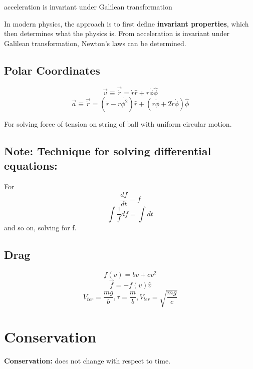 acceleration is invariant under Galilean transformation

\hfill
\hfill

In modern physics, the approach is to first define \textbf{invariant properties}, which then determines what the physics is. From acceleration is invariant under Galilean transformation, Newton's laws can be determined.



\subsection{Polar Coordinates}

\begin{equation}
	\label{}
	\vec{v}\equiv \vec{\dot{r}}=\dot{r}\hat{r}+r\dot{\phi}\hat{\phi}	
\end{equation}
\begin{equation}
	\label{}	
	\vec{a}\equiv \vec{\ddot{r}}=(\ddot{r}-r\dot{\phi^{2}})\hat{r}+(r\ddot{\phi}+2\dot{r}\dot{\phi})\hat{\phi}
\end{equation}

For solving force of tension on string of ball with uniform circular motion. 


\subsection{Note: Technique for solving differential equations:}

For
\begin{equation}
	\label{}
\frac{df}{dt}=f	
\end{equation}
\begin{equation}
	\label{}
\int\frac{1}{f}df=\int dt	
\end{equation}
and so on, solving for f.

\subsection{Drag}
\begin{equation}
	\label{}
f(v)=bv+cv^{2}	
\end{equation}
\begin{equation}
	\label{}
	\vec{f}=-f(v)\hat{v}	
\end{equation}
\begin{equation}
	\label{}
V_{ter}=\frac{mg}{b}	,	
\tau=\frac{m}{b},
V_{ter}=\sqrt{\frac{mg}{c}}
\end{equation}

\section{Conservation}
\textbf{Conservation: } does not change with respect to time.

